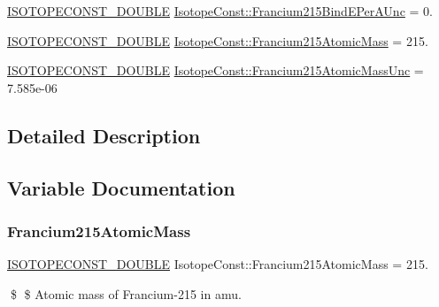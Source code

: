 \begin{DoxyCompactItemize}
\mbox{\hyperlink{group___isotope_const-_macros_ga8f45a7272ce02c0b4c65c44636ed719a}{I\+S\+O\+T\+O\+P\+E\+C\+O\+N\+S\+T\+\_\+\+D\+O\+U\+B\+LE}} \mbox{\hyperlink{group___isotope_const-_francium-_fr215_ga28d0c729a8f4d07c202fb6838a1dac27}{Isotope\+Const\+::\+Francium215\+Bind\+E\+Per\+A\+Unc}} = 0.
\item 
\mbox{\hyperlink{group___isotope_const-_macros_ga8f45a7272ce02c0b4c65c44636ed719a}{I\+S\+O\+T\+O\+P\+E\+C\+O\+N\+S\+T\+\_\+\+D\+O\+U\+B\+LE}} \mbox{\hyperlink{group___isotope_const-_francium-_fr215_ga60e333d52f539afc8c2f49d7e8ab986d}{Isotope\+Const\+::\+Francium215\+Atomic\+Mass}} = 215.
\item 
\mbox{\hyperlink{group___isotope_const-_macros_ga8f45a7272ce02c0b4c65c44636ed719a}{I\+S\+O\+T\+O\+P\+E\+C\+O\+N\+S\+T\+\_\+\+D\+O\+U\+B\+LE}} \mbox{\hyperlink{group___isotope_const-_francium-_fr215_ga4f7364bb88e3a29cbc03ac8f4c109f57}{Isotope\+Const\+::\+Francium215\+Atomic\+Mass\+Unc}} = 7.\+585e-\/06
\end{DoxyCompactItemize}


\subsection{Detailed Description}


\subsection{Variable Documentation}
\mbox{\label{group___isotope_const-_francium-_fr215_ga60e333d52f539afc8c2f49d7e8ab986d}} 
\subsubsection{\texorpdfstring{Francium215\+Atomic\+Mass}{Francium215AtomicMass}}
{\footnotesize\ttfamily \mbox{\hyperlink{group___isotope_const-_macros_ga8f45a7272ce02c0b4c65c44636ed719a}{I\+S\+O\+T\+O\+P\+E\+C\+O\+N\+S\+T\+\_\+\+D\+O\+U\+B\+LE}} Isotope\+Const\+::\+Francium215\+Atomic\+Mass = 215.}

\$ \$ Atomic mass of Francium-\/215 in amu. \mbox{\label{group___isotope_const-_francium-_fr215_ga4f7364bb88e3a29cbc03ac8f4c109f57}} 
